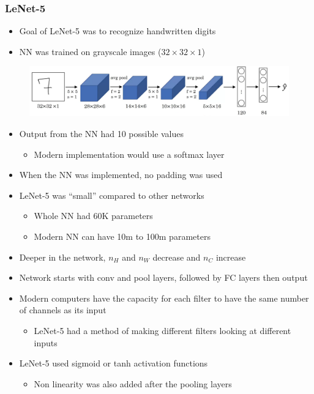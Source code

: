 \documentclass[12pt, letterpaper]{article}
\begin{document}
    \subsubsection{LeNet-5}
    \begin{itemize}
        \item Goal of LeNet-5 was to recognize handwritten digits
        \item NN was trained on grayscale images ($32\times 32 \times 1$)
    \end{itemize}
    \begin{figure}[ht]
        \centering
        \includegraphics[width=16cm]{24.png}
    \end{figure}
    \begin{itemize}
        \item Output from the NN had 10 possible values 
        \begin{itemize}
            \item Modern implementation would use a softmax layer
        \end{itemize}
        \item When the NN was implemented, no padding was used 
        \item LeNet-5 was ``small'' compared to other networks
        \begin{itemize}
            \item Whole NN had 60K parameters
            \item Modern NN can have 10m to 100m parameters
        \end{itemize}
        \item Deeper in the network, $n_H$ and $n_W$ decrease and $n_C$ increase
        \item Network starts with conv and pool layers, followed by FC layers then output 
        \item Modern computers have the capacity for each filter to have the same number of channels as its input
        \begin{itemize}
            \item LeNet-5 had a method of making different filters looking at different inputs
        \end{itemize}
        \item LeNet-5 used sigmoid or tanh activation functions
        \begin{itemize}
            \item Non linearity was also added after the pooling layers
        \end{itemize}
    \end{itemize}
\end{document}
